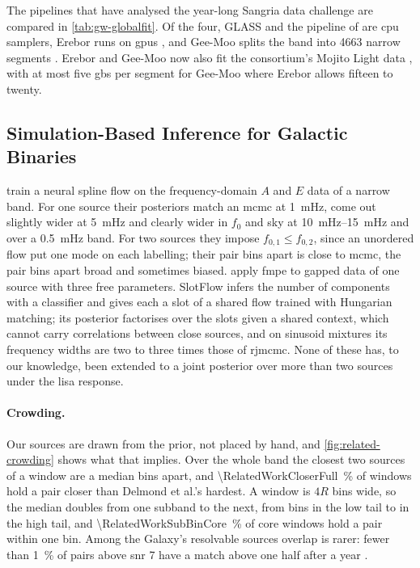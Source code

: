 The pipelines that have analysed the year-long Sangria data challenge \citep{baghi2022lisa} are
compared in \cref{tab:gw-globalfit}. Of the four, GLASS \citep{littenberg2023prototype} and the
pipeline of \citet{strub2024global} are \ac{cpu} samplers, Erebor runs on \acp{gpu}
\citep{katz2024efficient}, and Gee-Moo splits the band into \num{4663} narrow segments
\citep{deng2025modular}. Erebor and Gee-Moo now also fit the consortium's Mojito Light data
\citep{lisapriors}, with at most five \acp{gb} per segment for Gee-Moo where Erebor allows fifteen to
twenty.

\subsection{Simulation-Based Inference for Galactic Binaries}
\label{app:related-amortised}

\citet{delmond2026neural} train a neural spline flow on the frequency-domain $A$ and $E$ data
of a narrow band. For one source their posteriors match an \ac{mcmc} at \qty{1}{\milli\hertz}, come out slightly
wider at \qty{5}{\milli\hertz} and clearly wider in $f_0$ and sky at \qtyrange{10}{15}{\milli\hertz} and over a \qty{0.5}{\milli\hertz} band. For two sources they impose
$f_{0,1}\le f_{0,2}$, since an unordered flow put one mode on each labelling; their pair
\RelatedWorkDelmondEasiest{} bins apart is close to \ac{mcmc}, the pair \RelatedWorkDelmondHardest{}
bins apart broad and sometimes biased. \citet{mao2025robust} apply \ac{fmpe} to gapped data of one
source with three free parameters. SlotFlow \citep{houba2025slotflow} infers the number of
components with a classifier and gives each a slot of a shared flow trained with Hungarian
matching; its posterior factorises over the slots given a shared context, which cannot carry
correlations between close sources, and on sinusoid mixtures its frequency widths are two to
three times those of \ac{rjmcmc}. None of these has, to our knowledge, been extended to a joint
posterior over more than two sources under the \ac{lisa} response.

\paragraph{Crowding.}
Our sources are drawn from the prior, not placed by hand, and \cref{fig:related-crowding} shows what
that implies. Over the whole band the closest two sources of a window are a median
\RelatedWorkClosestFull{} bins apart, and \qty{\RelatedWorkCloserFull}{\percent} of windows hold a
pair closer than Delmond et al.'s hardest. A window is $4R$ bins wide, so the median doubles from one
subband to the next, from \RelatedWorkClosestLowTail{} bins in the low tail to
\RelatedWorkClosestHighTail{} in the high tail, and \qty{\RelatedWorkSubBinCore}{\percent} of core
windows hold a pair within one bin. Among the Galaxy's resolvable sources overlap is rarer: fewer
than \qty{1}{\percent} of pairs above \ac{snr} 7 have a match above one half after a year
\citep{littenberg2020global}.

